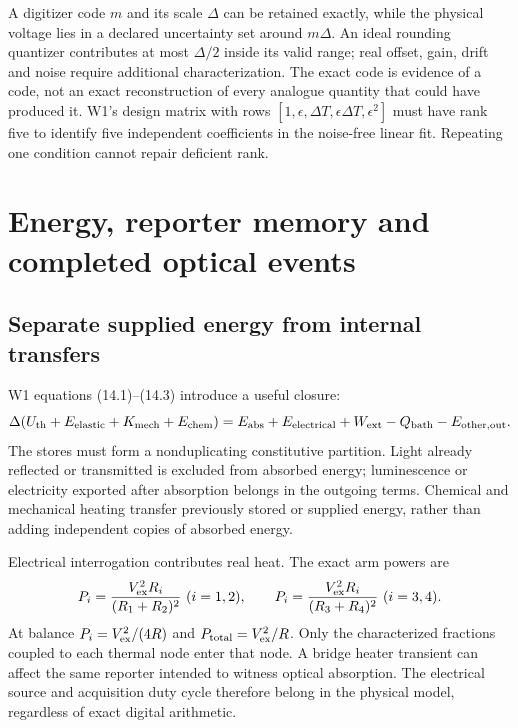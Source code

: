 A digitizer code $m$ and its scale $\Delta$ can be retained exactly, while
the physical voltage lies in a declared uncertainty set around $m\Delta$.
An ideal rounding quantizer contributes at most $\Delta/2$ inside its valid
range; real offset, gain, drift and noise require additional characterization.
The exact code is evidence of a code, not an exact reconstruction of every
analogue quantity that could have produced it. W1's design matrix with rows
$[1,\epsilon,\Delta T,\epsilon\Delta T,\epsilon^2]$ must have rank five
to identify five independent coefficients in the noise-free linear fit.
Repeating one condition cannot repair deficient rank.

\section{Energy, reporter memory and completed optical events}
\label{sec:want-energy}
\subsection{Separate supplied energy from internal transfers}
W1 equations (14.1)--(14.3) introduce a useful closure:
\begin{equation}
 \Delta(U_{\rm th}+E_{\rm elastic}+K_{\rm mech}+E_{\rm chem})
 =E_{\rm abs}+E_{\rm electrical}+W_{\rm ext}
                   -Q_{\rm bath}-E_{\rm other,out}.
 \label{eq:want-ledger}
\end{equation}
The stores must form a nonduplicating constitutive partition. Light already
reflected or transmitted is excluded from absorbed energy; luminescence or
electricity exported after absorption belongs in the outgoing terms.
Chemical and mechanical heating transfer previously stored or supplied
energy, rather than adding independent copies of absorbed energy.

Electrical interrogation contributes real heat. The exact arm powers are
\begin{equation}
 P_i=\frac{V_{\rm ex}^2R_i}{(R_1+R_2)^2}\ (i=1,2),\qquad
 P_i=\frac{V_{\rm ex}^2R_i}{(R_3+R_4)^2}\ (i=3,4).
\end{equation}
At balance $P_i=V_{\rm ex}^2/(4R)$ and $P_{\rm total}=V_{\rm ex}^2/R$.
Only the characterized fractions coupled to each thermal node enter that
node. A bridge heater transient can affect the same reporter intended to
witness optical absorption. The electrical source and acquisition duty cycle
therefore belong in the physical model, regardless of exact digital arithmetic.

